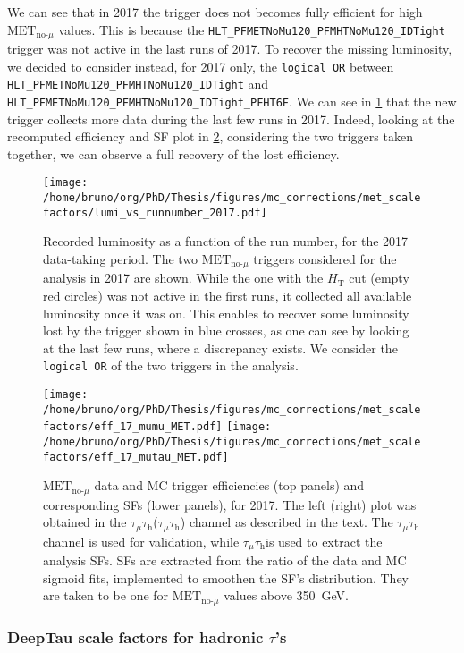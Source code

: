 \documentclass[11pt]{article}
\newcommand{\httt}{H_{\text{T}}}
\newcommand{\metnomu}{\text{MET}_{\text{no-}\mu}}
\newcommand{\logicor}[1]{\texttt{logical~OR}}
\newcommand{\mutau}{$\tau_{\mu}\tau_{\text{h}}$}
\newcommand{\mumu}{$\tau_{\mu}\tau_{\text{h}}$}
\begin{document}
We can see that in 2017 the trigger does not becomes fully efficient for high \(\metnomu\) values.
This is because the \texttt{HLT\_PFMETNoMu120\_PFMHTNoMu120\_IDTight} trigger was not active in the last runs of 2017.
To recover the missing luminosity, we decided to consider instead, for 2017 only, the \logicor{} between \texttt{HLT\_PFMETNoMu120\_PFMHTNoMu120\_IDTight} and \texttt{HLT\_PFMETNoMu120\_PFMHTNoMu120\_IDTight\_PFHT6F}.
We can see in \cref{fig:lumi_vs_runnumber_2017} that the new trigger collects more data during the last few runs in 2017.
Indeed, looking at the recomputed efficiency and SF plot in \cref{fig:eff_mumu_2017}, considering the two triggers taken together, we can observe a full recovery of the lost efficiency.

\begin{figure}
\texttt{[image: /home/bruno/org/PhD/Thesis/figures/mc\_corrections/met\_scalefactors/lumi\_vs\_runnumber\_2017.pdf]}
\caption{\label{fig:lumi_vs_runnumber_2017}Recorded luminosity as a function of the run number, for the 2017 data-taking period. The two \(\metnomu\) triggers considered for the analysis in 2017 are shown. While the one with the \(\httt\) cut (empty red circles) was not active in the first runs,  it collected all available luminosity once it was on. This enables to recover some luminosity lost by the trigger shown in blue crosses, as one can see by looking at the last few runs, where a discrepancy exists. We consider the \logicor{} of the two triggers in the analysis.}
\end{figure}

\begin{figure}
\texttt{[image: /home/bruno/org/PhD/Thesis/figures/mc\_corrections/met\_scalefactors/eff\_17\_mumu\_MET.pdf]}
\texttt{[image: /home/bruno/org/PhD/Thesis/figures/mc\_corrections/met\_scalefactors/eff\_17\_mutau\_MET.pdf]}
\caption{\label{fig:eff_mumu_2017}\(\metnomu\) data and MC trigger efficiencies (top panels) and corresponding \acp{SF} (lower panels), for 2017. The left (right) plot was obtained in the \mumu (\mutau{}) channel as described in the text. The \mumu{} channel is used for validation, while \mumu is used to extract the analysis \acp{SF}. \acp{SF} are extracted from the ratio of the data and MC sigmoid fits, implemented to smoothen the \ac{SF}'s distribution. They are taken to be one for \(\metnomu\) values above \SI{350}{\GeV}.}
\end{figure}
\subsubsection{DeepTau scale factors for hadronic \(\tau\)'s}
\label{sec:org2b9b0c9}
\end{document}
